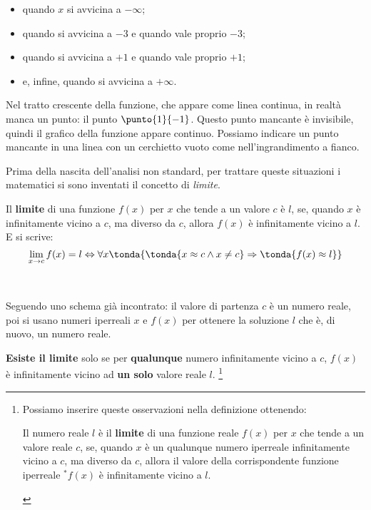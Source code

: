 \begin{minipage}{.64\textwidth}
\begin{itemize} [nosep]
 \item quando \(x\) si avvicina a \(-\infty\); 
 \item quando si avvicina a \(-3\) e quando vale proprio \(-3\);
 \item quando si avvicina a \(+1\) e quando vale proprio \(+1\); 
 \item e, infine, quando si avvicina a \(+\infty\).
\end{itemize}

\begin{osservazione}
Nel tratto crescente della funzione, che appare come linea continua, in 
realtà manca un punto: il punto \(\punto{1}{-1}\). 
Questo punto mancante è invisibile, quindi il grafico della funzione appare 
continuo. 
Possiamo indicare un punto mancante in una linea con un cerchietto vuoto 
come nell'ingrandimento a fianco.
\end{osservazione}

\end{minipage}
\hfill
\begin{minipage}{.34\textwidth}
\begin{center}\scalebox{1.2}{\limitigraficob}\end{center}
\end{minipage}

\vspace{1em}
Prima della nascita dell'analisi non standard, per trattare queste 
situazioni i matematici si sono inventati il concetto di 
\emph{limite}.

\begin{definizione}
Il \textbf{limite} di una funzione \(f(x)\) per \(x\) 
che tende a un valore \(c\) è \(l\),
se, quando \(x\) è infinitamente vicino a \(c\), 
ma diverso da \(c\), 
allora \(f(x)\) è infinitamente vicino a \(l\). E si scrive:
\[\lim_{x \rightarrow c} f(x) = l \Leftrightarrow 
\forall x \tonda{\tonda{x \approx c \wedge x \neq c} \Rightarrow 
\tonda{f(x) \approx l}}\]
\end{definizione}
\begin{osservazione}
~

Seguendo uno schema già incontrato: 
il valore di partenza \(c\) è un numero reale, 
poi si usano numeri iperreali \(x\) e \(f(x)\)
per ottenere la soluzione \(l\) che è, di nuovo, un numero reale.

\textbf{Esiste il limite} solo se per \textbf{qualunque} numero 
infinitamente 
vicino a \(c\), \(f(x)\) è infinitamente vicino ad \textbf{un solo} valore 
reale \(l\).
\footnote{Possiamo inserire queste osservazioni nella definizione ottenendo:
\begin{definizione}
Il numero reale \(l\) è il \textbf{limite} di una funzione reale \(f(x)\) 
per \(x\) che tende a un valore reale \(c\), se, 
quando \(x\) è un qualunque numero iperreale infinitamente vicino a \(c\), 
ma diverso da \(c\), 
allora il valore della corrispondente funzione iperreale \({}^*f(x)\) è 
infinitamente vicino a \(l\).
\end{definizione}}
\end{osservazione}

